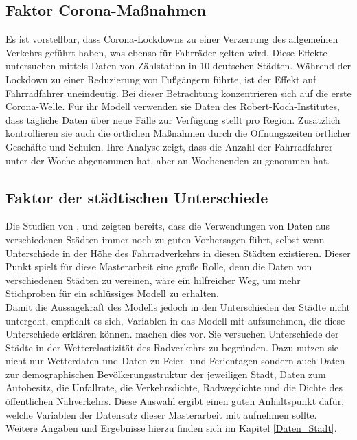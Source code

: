 \documentclass[a4paper,12pt]{thesis}
\begin{document}
\subsection{Faktor Corona-Maßnahmen}

Es ist vorstellbar, dass Corona-Lockdowns zu einer Verzerrung des allgemeinen Verkehrs geführt haben, was ebenso für Fahrräder gelten wird. Diese Effekte untersuchen \cite{Moellers2021} mittels Daten von Zählstation in 10 deutschen Städten. Während der Lockdown zu einer Reduzierung von Fußgängern führte, ist der Effekt auf Fahrradfahrer uneindeutig. Bei dieser Betrachtung konzentrieren sich \cite{Moellers2021} auf die erste Corona-Welle. Für ihr Modell verwenden sie Daten des Robert-Koch-Institutes, dass tägliche Daten über neue Fälle zur Verfügung stellt pro Region. Zusätzlich kontrollieren sie auch die örtlichen Maßnahmen durch die Öffnungszeiten örtlicher Geschäfte und Schulen. Ihre Analyse zeigt, dass die Anzahl der Fahrradfahrer unter der Woche abgenommen hat, aber an Wochenenden zu genommen hat.

\subsection{Faktor der städtischen Unterschiede}\label{Faktor_Stadt}

Die Studien von \cite{Wessel2020}, \cite{Moellers2021} und \cite{Goldmann2021} zeigten bereits, dass die Verwendungen von Daten aus verschiedenen Städten immer noch zu guten Vorhersagen führt, selbst wenn Unterschiede in der Höhe des Fahrradverkehrs in diesen Städten existieren. Dieser Punkt spielt für diese Masterarbeit eine große Rolle, denn die Daten von verschiedenen Städten zu vereinen, wäre ein hilfreicher Weg, um mehr Stichproben für ein schlüssiges Modell zu erhalten.\\
Damit die Aussagekraft des Modells jedoch in den Unterschieden der Städte nicht untergeht, empfiehlt es sich, Variablen in das Modell mit aufzunehmen, die diese Unterschiede erklären können. \cite{Goldmann2021} machen dies vor. Sie versuchen Unterschiede der Städte in der Wetterelastizität des Radverkehrs zu begründen. Dazu nutzen sie nicht nur Wetterdaten und Daten zu Feier- und Ferientagen sondern auch Daten zur demographischen Bevölkerungsstruktur der jeweiligen Stadt, Daten zum Autobesitz, die Unfallrate, die Verkehrsdichte, Radwegdichte und die Dichte des öffentlichen Nahverkehrs. Diese Auswahl ergibt einen guten Anhaltspunkt dafür, welche Variablen der Datensatz dieser Masterarbeit mit aufnehmen sollte. Weitere Angaben und Ergebnisse hierzu finden sich im Kapitel \ref{Daten_Stadt}.
\end{document}
